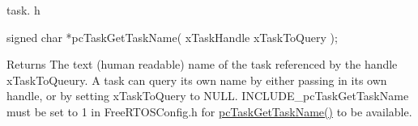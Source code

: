 task. h 
\begin{DoxyPre}signed char *pcTaskGetTaskName( xTaskHandle xTaskToQuery );\end{DoxyPre}


\begin{DoxyReturn}{Returns}
The text (human readable) name of the task referenced by the handle x\-Task\-To\-Queury. A task can query its own name by either passing in its own handle, or by setting x\-Task\-To\-Query to N\-U\-L\-L. I\-N\-C\-L\-U\-D\-E\-\_\-pc\-Task\-Get\-Task\-Name must be set to 1 in Free\-R\-T\-O\-S\-Config.\-h for \hyperlink{_common_2_libraries_2_free_r_t_o_s_2_source_2include_2task_8h_a9f1840f3a1d2527e76d301fc1a6aba37}{pc\-Task\-Get\-Task\-Name()} to be available. 
\end{DoxyReturn}
